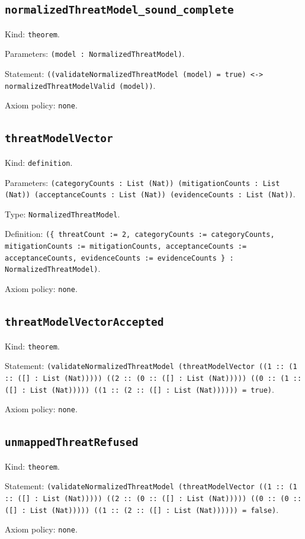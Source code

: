 \documentclass[11pt]{article}
\begin{document}
\subsection*{\texttt{normalizedThreatModel\_sound\_complete}}
\noindent Kind: \texttt{theorem}.\par
\noindent Parameters: \texttt{(model : NormalizedThreatModel)}.\par
\noindent Statement: \texttt{((validateNormalizedThreatModel (model) = true) <-> normalizedThreatModelValid (model))}.\par
\noindent Axiom policy: \texttt{none}.\par
\subsection*{\texttt{threatModelVector}}
\noindent Kind: \texttt{definition}.\par
\noindent Parameters: \texttt{(categoryCounts : List (Nat)) (mitigationCounts : List (Nat)) (acceptanceCounts : List (Nat)) (evidenceCounts : List (Nat))}.\par
\noindent Type: \texttt{NormalizedThreatModel}.\par
\noindent Definition: \texttt{(\{ threatCount := 2, categoryCounts := categoryCounts, mitigationCounts := mitigationCounts, acceptanceCounts := acceptanceCounts, evidenceCounts := evidenceCounts \} : NormalizedThreatModel)}.\par
\noindent Axiom policy: \texttt{none}.\par
\subsection*{\texttt{threatModelVectorAccepted}}
\noindent Kind: \texttt{theorem}.\par
\noindent Statement: \texttt{(validateNormalizedThreatModel (threatModelVector ((1 :: (1 :: ([] : List (Nat))))) ((2 :: (0 :: ([] : List (Nat))))) ((0 :: (1 :: ([] : List (Nat))))) ((1 :: (2 :: ([] : List (Nat)))))) = true)}.\par
\noindent Axiom policy: \texttt{none}.\par
\subsection*{\texttt{unmappedThreatRefused}}
\noindent Kind: \texttt{theorem}.\par
\noindent Statement: \texttt{(validateNormalizedThreatModel (threatModelVector ((1 :: (1 :: ([] : List (Nat))))) ((2 :: (0 :: ([] : List (Nat))))) ((0 :: (0 :: ([] : List (Nat))))) ((1 :: (2 :: ([] : List (Nat)))))) = false)}.\par
\noindent Axiom policy: \texttt{none}.\par
\end{document}
